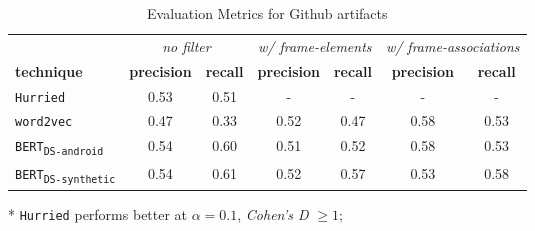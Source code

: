 \begin{table}[H]
\centering    
\begin{small}
\begin{threeparttable}
\begin{tabular}{lcccccc}


& \multicolumn{2}{c}{\textit{no filter}} 
& \multicolumn{2}{c}{\textit{w/ frame-elements}}
& \multicolumn{2}{c}{\textit{w/ frame-associations}}

\\ \cmidrule(l){2-3} \cmidrule(l){4-5} \cmidrule(l){6-7} 


\textbf{technique} & 
\textbf{precision} & \textbf{recall} &
\textbf{precision} & \textbf{recall} &
\textbf{precision} & \textbf{recall} \\ 


\hline


\texttt{Hurried} &
0.53 & 0.51 &
- & - &
- & -
\\

\texttt{word2vec} &
0.47 & 0.33\tnote{*} &
0.52 & 0.47 &
0.58 &  0.53 
\\


\texttt{BERT\textsubscript{DS-android}} &
0.54 & 0.60 &
0.51 & 0.52 &
0.58 & 0.53 
\\


\texttt{BERT\textsubscript{DS-synthetic}} &
0.54 & 0.61 &
0.52 & 0.57 &
0.53 & 0.58 
\\



\hline

\end{tabular}
\begin{tablenotes}
    \item[*] \texttt{Hurried} performs better at $\alpha = 0.1$, \textit{Cohen's D} $\ge 1$;
\end{tablenotes}
\end{threeparttable}
\end{small}
\caption{Evaluation Metrics for Github artifacts}
\label{tbl:techniques-results-github}
\end{table}

